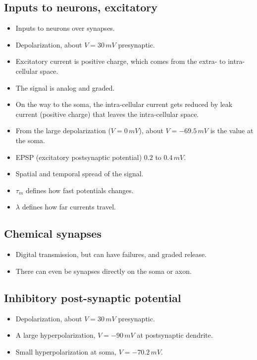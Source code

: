 \documentclass[main]{subfiles}
\begin{document}
\subsection{Inputs to neurons, excitatory}
\begin{itemize}[noitemsep,nolistsep]
	\item Inputs to neurons over synapses.
	\item Depolarization, about $V=30\,mV$ presynaptic.
	\item Excitatory current is positive charge, which comes from the extra- to intra-cellular space.
	\item The signal is analog and graded.
	\item On the way to the soma, the intra-cellular current gets reduced by leak current (positive charge) that leaves the intra-cellular space.
	\item From the large depolarization ($V=0\,mV$), about $V=-69.5\,mV$ is the value at the soma.
	\item EPSP (excitatory postsynaptic potential) $0.2$ to $0.4\,mV$.
	\item Spatial and temporal spread of the signal.
	\item $\tau_m$ defines how fast potentials changes.
	\item $\lambda$ defines how far currents travel.
\end{itemize}
\begin{figure}[H]
	\centering
\end{figure}

\subsection{Chemical synapses}
\begin{figure}[H]
	\centering
\end{figure}
\begin{itemize}[noitemsep,nolistsep]
	\item Digital transmission, but can have failures, and graded release.
	\item There can even be synapses directly on the soma or axon.
\end{itemize}

\subsection{Inhibitory post-synaptic potential}
\begin{itemize}[noitemsep,nolistsep]
	\item Depolarization, about $V=30\,mV$ presynaptic.
	\item A large hyperpolarization, $V=-90\,mV$ at postsynaptic dendrite.
	\item Small hyperpolarization at soma, $V=-70.2\,mV$.
\end{itemize}
\end{document}
